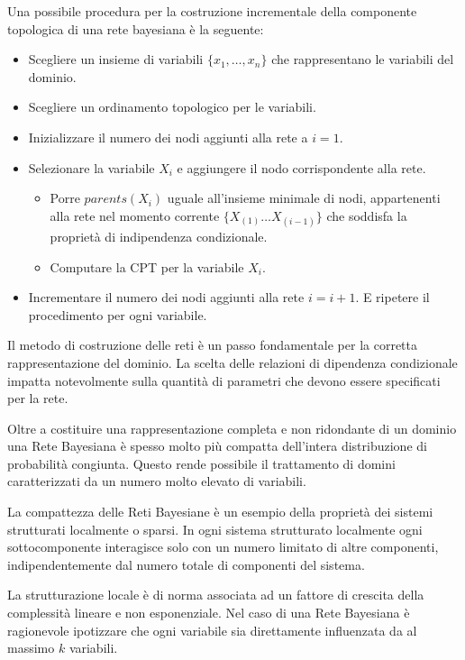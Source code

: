 Una possibile procedura per la costruzione incrementale della componente topologica
di una rete bayesiana è la seguente:
\begin{itemize}
    \item Scegliere un insieme di variabili $\{x_1, \dots, x_n\}$ che rappresentano
          le variabili del dominio.
    \item Scegliere un ordinamento topologico per le variabili.
    \item Inizializzare il numero dei nodi aggiunti alla rete a $i=1$.
    \item Selezionare la variabile $X_i$ e aggiungere il nodo corrispondente alla
          rete.
          \begin{itemize}
              \item Porre $parents(X_i)$ uguale all'insieme minimale di nodi,
                    appartenenti alla rete nel momento corrente $\{X_{(1)} \dots X_{(i-1)}\}$
                    che soddisfa la proprietà di indipendenza condizionale.
              \item Computare la CPT per la variabile $X_i$.
          \end{itemize}
    \item Incrementare il numero dei nodi aggiunti alla rete $i=i+1$. E ripetere il
          procedimento per ogni variabile.
\end{itemize}
Il metodo di costruzione delle reti è un passo fondamentale per la corretta
rappresentazione del dominio. La scelta delle relazioni di dipendenza condizionale
impatta notevolmente sulla quantità di parametri che devono essere specificati
per la rete.

Oltre a costituire una rappresentazione completa e non ridondante di un dominio
una Rete Bayesiana è spesso molto più compatta dell'intera distribuzione di
probabilità congiunta. Questo rende possibile il trattamento di domini
caratterizzati da un numero molto elevato di variabili.

La compattezza delle Reti Bayesiane è un esempio della proprietà dei sistemi
strutturati localmente o sparsi. In ogni sistema strutturato localmente ogni
sottocomponente interagisce solo con un numero limitato di altre componenti,
indipendentemente dal numero totale di componenti del sistema.

La strutturazione locale è di norma associata ad un fattore di crescita della
complessità lineare e non esponenziale. Nel caso di una Rete Bayesiana è ragionevole
ipotizzare che ogni variabile sia direttamente influenzata da al massimo $k$
variabili.

